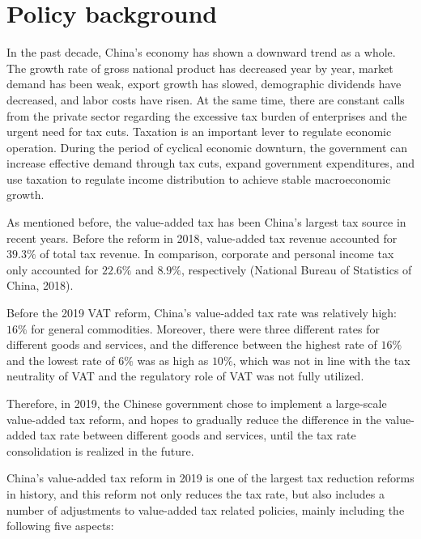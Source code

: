 \documentclass[3p,times]{elsarticle}
\begin{document}
\section{Policy background}\label{sec:2}
In the past decade, China's economy has shown a downward trend as a whole. The growth rate of gross national product has decreased year by year, market demand has been weak, export growth has slowed, demographic dividends have decreased, and labor costs have risen. At the same time, there are constant calls from the private sector regarding the excessive tax burden of enterprises and the urgent need for tax cuts. Taxation is an important lever to regulate economic operation. During the period of cyclical economic downturn, the government can increase effective demand through tax cuts, expand government expenditures, and use taxation to regulate income distribution to achieve stable macroeconomic growth.

As mentioned before, the value-added tax has been China's largest tax source in recent years. Before the reform in 2018, value-added tax revenue accounted for $39.3\%$ of total tax revenue. In comparison, corporate and personal income tax only accounted for $22.6\%$ and $8.9\%$, respectively (National Bureau of Statistics of China, 2018). 

Before the 2019 VAT reform, China’s value-added tax rate was relatively high: $16\%$ for general commodities. Moreover, there were three different rates for different goods and services, and the difference between the highest rate of $16\%$ and the lowest rate of $6\%$ was as high as $10\%$, which was not in line with the tax neutrality of VAT and the regulatory role of VAT was not fully utilized. 

Therefore, in 2019, the Chinese government chose to implement a large-scale value-added tax reform, and hopes to gradually reduce the difference in the value-added tax rate between different goods and services, until the tax rate consolidation is realized in the future.

China's value-added tax reform in 2019 is one of the largest tax reduction reforms in history, and this reform not only reduces the tax rate, but also includes a number of adjustments to value-added tax related policies, mainly including the following five aspects:
\end{document}
